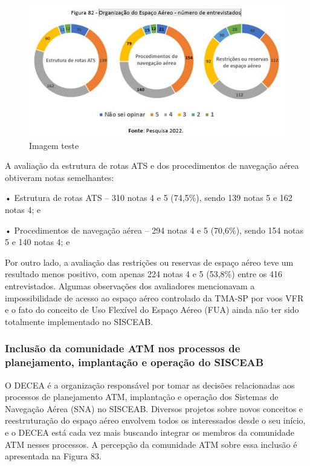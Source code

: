 \documentclass[
]{book}
\begin{document}
\begin{figure}
\centering
\includegraphics{imagens/fig69.jpg}
\caption{Imagem teste}
\end{figure}

A avaliação da estrutura de rotas ATS e dos procedimentos de navegação aérea obtiveram notas semelhantes:

• Estrutura de rotas ATS -- 310 notas 4 e 5 (74,5\%), sendo 139 notas 5 e 162 notas 4; e

• Procedimentos de navegação aérea -- 294 notas 4 e 5 (70,6\%), sendo 154 notas 5 e 140 notas 4; e

Por outro lado, a avaliação das restrições ou reservas de espaço aéreo teve um resultado menos positivo, com apenas 224 notas 4 e 5 (53,8\%) entre os 416 entrevistados. Algumas observações dos avaliadores mencionavam a impossibilidade de acesso ao espaço aéreo controlado da TMA-SP por voos VFR e o fato do conceito de Uso Flexível do Espaço Aéreo (FUA) ainda não ter sido totalmente implementado no SISCEAB.

\hypertarget{inclusuxe3o-da-comunidade-atm-nos-processos-de-planejamento-implantauxe7uxe3o-e-operauxe7uxe3o-do-sisceab}{%
\subsubsection{Inclusão da comunidade ATM nos processos de planejamento, implantação e operação do SISCEAB}\label{inclusuxe3o-da-comunidade-atm-nos-processos-de-planejamento-implantauxe7uxe3o-e-operauxe7uxe3o-do-sisceab}}

O DECEA é a organização responsável por tomar as decisões relacionadas aos processos de planejamento ATM, implantação e operação dos Sistemas de Navegação Aérea (SNA) no SISCEAB. Diversos projetos sobre novos conceitos e reestruturação do espaço aéreo envolvem todos os interessados desde o seu início, e o DECEA está cada vez mais buscando integrar os membros da comunidade ATM nesses processos. A percepção da comunidade ATM sobre essa inclusão é apresentada na Figura 83.
\end{document}
